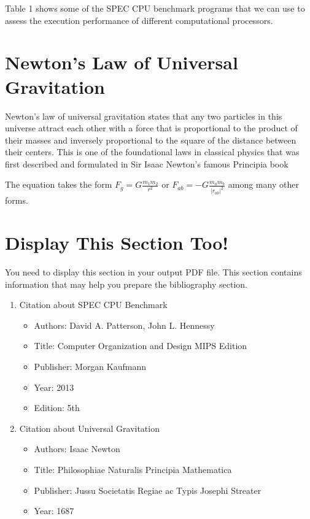 \documentclass[11pt]{article}
\begin{document}
    

    Table 1 shows some of the SPEC CPU benchmark programs that we can use to assess
the execution performance of different computational processors.
\pagebreak

    \section*{Newton’s Law of Universal Gravitation}
    Newton’s law of universal gravitation states that any two particles in this universe attract
each other with a force that is proportional to the product of their masses and inversely
proportional to the square of the distance between their centers. This is one of the foundational laws in classical physics that was first described and formulated in Sir Isaac Newton’s
famous Principia book \cite{newtbook}

The equation takes the form $F_g=G\frac{m_1m_2}{r^2}$ or $F_{ab}=-G\frac{m_am_b}{|r_{ab}|^2}$ among many other forms.

\section*{Display This Section Too!}
You need to display this section in your output PDF file. This section contains information
that may help you prepare the bibliography section.

\begin{enumerate}
    \item Citation about SPEC CPU Benchmark
    \begin{itemize}
        \item Authors: David A. Patterson, John L. Hennessy
        \item Title: Computer Organization and Design MIPS Edition
        \item Publisher: Morgan Kaufmann
        \item Year: 2013
        \item Edition: 5th
    \end{itemize}
    \item Citation about Universal Gravitation
    \begin{itemize}
        \item Authors: Isaac Newton
        \item Title: Philosophiae Naturalis Principia Mathematica
        \item Publisher: Jussu Societatis Regiae ac Typis Josephi Streater
        \item Year: 1687
    \end{itemize}
\end{enumerate}



    
\end{document}
